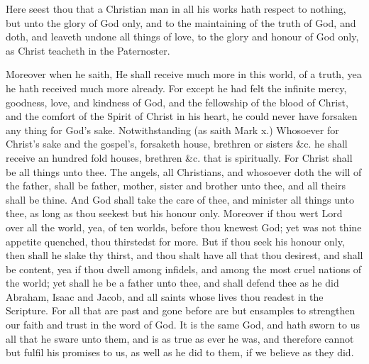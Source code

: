 Here seest thou that a Christian man in all his works 
hath respect to nothing, but unto the glory of God only, 
and to the maintaining of the truth of God, and doth, 
and leaveth undone all things of love, to the glory and 
honour of God only, as Christ teacheth in the Paternoster. 

Moreover when he saith, He shall receive much more 
in this world, of a truth, yea he hath received much more 
already. For except he had felt the infinite mercy, 
goodness, love, and kindness of God, and the fellowship 
of the blood of Christ, and the comfort of the Spirit of 
Christ in his heart, he could never have forsaken any thing 
for God's sake. Notwithstanding (as saith Mark x.) 
Whosoever for Christ's sake and the gospel's, forsaketh 
house, brethren or sisters \&c. he shall receive an hundred
fold houses, brethren \&c. that is spiritually. For 
Christ shall be all things unto thee. The angels, all 
Christians, and whosoever doth the will of the father, 
shall be father, mother, sister and brother unto thee, and 
all theirs shall be thine. And God shall take the care of 
thee, and minister all things unto thee, as long as thou 
seekest but his honour only. Moreover if thou wert 
Lord over all the world, yea, of ten worlds, before thou 
knewest God; yet was not thine appetite quenched, thou 
thirstedst for more. But if thou seek his honour only, 
then shall he slake thy thirst, and thou shalt have all that 
thou desirest, and shall be content, yea if thou dwell 
among infidels, and among the most cruel nations of 
the world; yet shall he be a father unto thee, and shall 
defend thee as he did Abraham, Isaac and Jacob, and all 
saints whose lives thou readest in the Scripture. For all 
that are past and gone before are but ensamples to strengthen 
our faith and trust in the word of God. It is the same 
God, and hath sworn to us all that he sware unto them, 
and is as true as ever he was, and therefore cannot but fulfil
his promises to us, as well as he did to them, if we 
believe as they did. 

